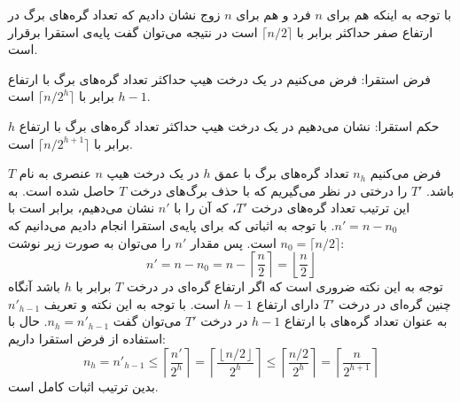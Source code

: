 با توجه به اینکه هم برای {$n$} فرد و هم برای {$n$} زوج نشان دادیم که تعداد گره‌های برگ در ارتفاع صفر حداکثر برابر با {$\lceil n/2\rceil$} است در نتیجه می‌توان گفت پایه‌ی استقرا برقرار است.

فرض استقرا: فرض می‌کنیم در یک درخت هیپ حداکثر تعداد گره‌های برگ با ارتفاع {$h-1$} برابر با {$\lceil n/2^{h}\rceil$} است.

حکم استقرا: نشان می‌دهیم در یک درخت هیپ حداکثر تعداد گره‌های برگ با ارتفاع {$h$} برابر با {$\lceil n/2^{h+1}\rceil$} است.

فرض می‌کنیم {$n_h$} تعداد گره‌های برگ با عمق {$h$} در یک درخت هیپ {$n$} عنصری به نام {$T$} باشد. {$T'$} را درختی در نظر می‌گیریم که با حذف برگ‌های درخت {$T$} حاصل شده است. به این ترتیب تعداد گره‌های درخت {$T'$}، که آن را با {$n'$} نشان می‌دهیم، برابر است با {$n'=n-n_0$}. با توجه به اثباتی که برای پایه‌ی استقرا انجام دادیم می‌دانیم که {$n_0=\lceil n/2 \rceil$} است. پس مقدار {$n'$} را می‌توان به صورت زیر نوشت:
\begin{displaymath}
n' = n - n_0=n-\left\lceil \frac{n}{2}\right\rceil =\left\lfloor \frac{n}{2}\right\rfloor
\end{displaymath}
توجه به این نکته ضروری است که اگر ارتفاع گره‌ای در درخت {$T$} برابر با {$h$} باشد آنگاه چنین گره‌ای در درخت {$T'$} دارای ارتفاع {$h-1$} است. با توجه به این نکته و تعریف {${n'}_{h-1}$} به ‌عنوان تعداد گره‌های با ارتفاع {$h-1$} در درخت {$T'$} می‌توان گفت {$n_h=n'_{h-1}$}. حال با استفاده از فرض استقرا داریم:
\begin{displaymath}
n_h=n'_{h-1} \leq \left\lceil \frac{n'}{2^h}\right\rceil=\left\lceil \frac{\left\lfloor n/2 \right\rfloor}{2^h}\right\rceil \leq \left\lceil \frac{n/2}{2^h}\right\rceil=\left\lceil \frac{n}{2^{h+1}} \right\rceil
\end{displaymath}
بدین ترتیب اثبات کامل است.

